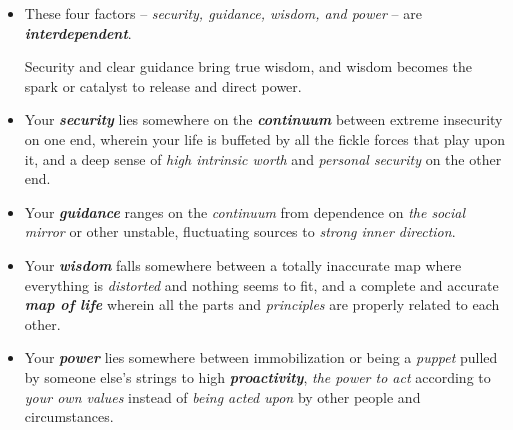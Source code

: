 \documentclass[11pt]{article}
\begin{document}
\begin{itemize}
\item These four factors -- \emph{security, guidance, wisdom, and power} -- are \emph{\textbf{interdependent}}. 

Security and clear guidance bring true wisdom, and wisdom becomes the spark or catalyst to release and direct power.

\item Your \emph{\textbf{security}} lies somewhere on the \emph{\textbf{continuum}} between extreme insecurity on one end, wherein your life is buffeted by all the fickle forces that play upon it, and a deep sense of \emph{high intrinsic worth} and \emph{personal security} on the other end. 

\item Your \emph{\textbf{guidance}} ranges on the \emph{continuum} from dependence on \emph{the social mirror} or other unstable, fluctuating sources to \emph{strong inner direction}. 

\item Your \emph{\textbf{wisdom}} falls somewhere between a totally inaccurate map where everything is \emph{distorted} and nothing seems to fit, and a complete and accurate \emph{\textbf{map of life}} wherein all the parts and \emph{principles} are properly related to each other.

\item Your \emph{\textbf{power}} lies somewhere between immobilization or being a \emph{puppet} pulled by someone else's strings to high \emph{\textbf{proactivity}}, \emph{the power to act} according to \emph{your own values} instead of \emph{being acted upon} by other people and circumstances.
\end{itemize}
\end{document}
